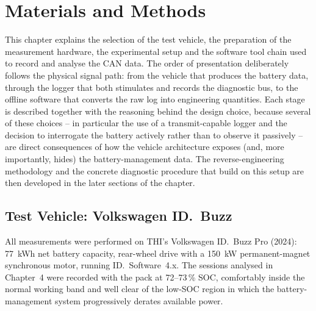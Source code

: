 \documentclass[11pt,a4paper,oneside,parskip=half]{scrreprt}
\begin{document}

\chapter{Materials and Methods}
This chapter explains the selection of the test vehicle, the preparation of the measurement hardware, the experimental setup and the software tool chain used to record and analyse the CAN data. The order of presentation deliberately follows the physical signal path: from the vehicle that produces the battery data, through the logger that both stimulates and records the diagnostic bus, to the offline software that converts the raw log into engineering quantities. Each stage is described together with the reasoning behind the design choice, because several of these choices -- in particular the use of a transmit-capable logger and the decision to interrogate the battery actively rather than to observe it passively -- are direct consequences of how the vehicle architecture exposes (and, more importantly, hides) the battery-management data. The reverse-engineering methodology and the concrete diagnostic procedure that build on this setup are then developed in the later sections of the chapter.

\section{Test Vehicle: Volkswagen ID.~Buzz}
All measurements were performed on THI's Volkswagen ID.~Buzz Pro (2024): 77~kWh net battery capacity, rear-wheel drive with a 150~kW permanent-magnet synchronous motor, running ID.~Software~4.x. The sessions analysed in Chapter~4 were recorded with the pack at 72--73\,\% SOC, comfortably inside the normal working band and well clear of the low-SOC region in which the battery-management system progressively derates available power.
\end{document}
